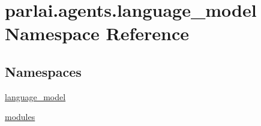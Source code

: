 \hypertarget{namespaceparlai_1_1agents_1_1language__model}{}\section{parlai.\+agents.\+language\+\_\+model Namespace Reference}
\label{namespaceparlai_1_1agents_1_1language__model}
\subsection*{Namespaces}
\begin{DoxyCompactItemize}
\item 
 \hyperlink{namespaceparlai_1_1agents_1_1language__model_1_1language__model}{language\+\_\+model}
\item 
 \hyperlink{namespaceparlai_1_1agents_1_1language__model_1_1modules}{modules}
\end{DoxyCompactItemize}
